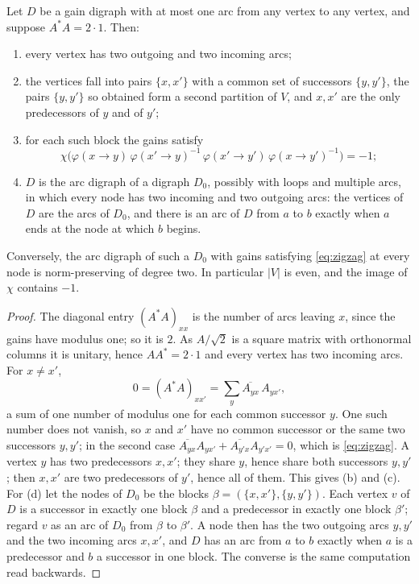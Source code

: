 \begin{theorem}\label{thm:arc}
Let $D$ be a gain digraph with at most one arc from any vertex to any vertex, and suppose $A^*A=2\cdot1$. Then:
\begin{enumerate}[label=(\alph*)]
\item every vertex has two outgoing and two incoming arcs;
\item the vertices fall into pairs $\{x,x'\}$ with a common set of successors $\{y,y'\}$, the pairs $\{y,y'\}$ so obtained form a second partition of $V$, and $x,x'$ are the only predecessors of $y$ and of $y'$;
\item for each such block the gains satisfy
\begin{equation}\label{eq:zigzag}
\chi\bigl(\varphi(x\to y)\,\varphi(x'\to y)^{-1}\,\varphi(x'\to y')\,\varphi(x\to y')^{-1}\bigr)=-1 ;
\end{equation}
\item $D$ is the arc digraph of a digraph $D_0$, possibly with loops and multiple arcs, in which every node has two incoming and two outgoing arcs: the vertices of $D$ are the arcs of $D_0$, and there is an arc of $D$ from $a$ to $b$ exactly when $a$ ends at the node at which $b$ begins.
\end{enumerate}
Conversely, the arc digraph of such a $D_0$ with gains satisfying \eqref{eq:zigzag} at every node is norm-preserving of degree two. In particular $|V|$ is even, and the image of $\chi$ contains $-1$.
\end{theorem}
\begin{proof}
The diagonal entry $(A^*A)_{xx}$ is the number of arcs leaving $x$, since the gains have modulus one; so it is $2$. As $A/\sqrt2$ is a square matrix with orthonormal columns it is unitary, hence $AA^*=2\cdot1$ and every vertex has two incoming arcs. For $x\ne x'$,
\[
0=(A^*A)_{xx'}=\sum_{y}\overline{A_{yx}}\,A_{yx'},
\]
a sum of one number of modulus one for each common successor $y$. One such number does not vanish, so $x$ and $x'$ have no common successor or the same two successors $y,y'$; in the second case $\overline{A_{yx}}A_{yx'}+\overline{A_{y'x}}A_{y'x'}=0$, which is \eqref{eq:zigzag}. A vertex $y$ has two predecessors $x,x'$; they share $y$, hence share both successors $y,y'$; then $x,x'$ are two predecessors of $y'$, hence all of them. This gives (b) and (c). For (d) let the nodes of $D_0$ be the blocks $\beta=(\{x,x'\},\{y,y'\})$. Each vertex $v$ of $D$ is a successor in exactly one block $\beta$ and a predecessor in exactly one block $\beta'$; regard $v$ as an arc of $D_0$ from $\beta$ to $\beta'$. A node then has the two outgoing arcs $y,y'$ and the two incoming arcs $x,x'$, and $D$ has an arc from $a$ to $b$ exactly when $a$ is a predecessor and $b$ a successor in one block. The converse is the same computation read backwards.
\end{proof}

